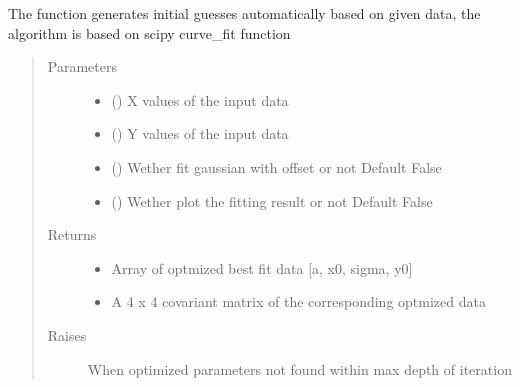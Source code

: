 \documentclass[letterpaper,10pt,english]{sphinxmanual}
\begin{document}
\begin{fulllineitems}
\begin{fulllineitems}
The function generates initial guesses automatically based on
given data, the algorithm is based on scipy curve\_fit function
\begin{quote}\begin{description}
\item[{Parameters}] \leavevmode\begin{itemize}
\item {} 
 () \textendash{} X values of the input data

\item {} 
 () \textendash{} Y values of the input data

\item {} 
 () \textendash{} Wether fit gaussian with offset or not
Default False

\item {} 
 () \textendash{} Wether plot the fitting result or not
Default False

\end{itemize}

\item[{Returns}] \leavevmode
\begin{itemize}
\item {} 
 \textendash{} Array of optmized best fit data {[}a, x0, sigma, y0{]}

\item {} 
 \textendash{} A 4 x 4 covariant matrix of the corresponding optmized data

\end{itemize}


\item[{Raises}] \leavevmode
{} \textendash{} When optimized parameters not found within max depth of iteration

\end{description}\end{quote}

\end{fulllineitems}


\end{fulllineitems}
\end{document}
